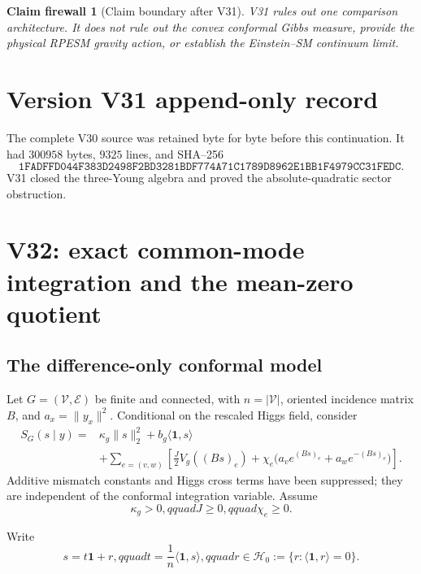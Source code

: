 \documentclass[11pt]{article}
\newtheorem{firewall}[theorem]{Claim firewall}
\theoremstyle{remark}
\begin{document}
\begin{firewall}[Claim boundary after V31]
\label{fire:v17v31}
V31 rules out one comparison architecture.  It does not rule out the
convex conformal Gibbs measure, provide the physical RPESM gravity
action, or establish the Einstein--SM continuum limit.
\end{firewall}

\section*{Version V31 append-only record}
The complete V30 source was retained byte for byte before this
continuation.  It had \(300958\) bytes, \(9325\) lines, and SHA--256
\[
 \texttt{1FADFFD044F383D2498F2BD3281BDF774A71C1789D8962E1BB1F4979CC31FEDC}.
\]
V31 closed the three-Young algebra and proved the absolute-quadratic
sector obstruction.


\section{V32: exact common-mode integration and the mean-zero quotient}
\label{sec:v17v32}

\subsection{The difference-only conformal model}

Let \(G=(\mathcal V,\mathcal E)\) be finite and connected, with
\(n=|\mathcal V|\), oriented incidence matrix \(B\), and
\(a_x=\|y_x\|^2\).  Conditional on the rescaled Higgs field, consider
\[
\begin{aligned}
 S_G(s\mid y)={}&\kappa_g\|s\|_2^2
 +b_g\langle\mathbf1,s\rangle\\
 &+\sum_{e=(v,w)}\left[
 \frac J2V_g((Bs)_e)
 +\chi_e\bigl(a_ve^{(Bs)_e}+a_we^{-(Bs)_e}\bigr)
 \right].                                         \tag{32.1}
\end{aligned}
\]
Additive mismatch constants and Higgs cross terms have been suppressed;
they are independent of the conformal integration variable.  Assume
\[
 \kappa_g>0,qquad J\geq0,qquad\chi_e\geq0.        \tag{32.2}
\]

Write
\[
 s=t\mathbf1+r,qquad
 t=\frac1n\langle\mathbf1,s\rangle,qquad
 r\in\mathcal H_0:=\{r:\langle\mathbf1,r\rangle=0\}.           \tag{32.3}
\]
\end{document}

